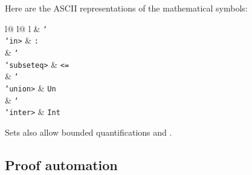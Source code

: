 \begin{isabellebody}
\begin{isamarkuptext}
Here are the ASCII representations of the mathematical symbols:
\begin{center}
\begin{tabular}{l@ {\quad}l@ {\quad}l}
 & \texttt{\char`\\\char`\<in>} & \texttt{:}\\
 & \texttt{\char`\\\char`\<subseteq>} & \texttt{<=}\\
 & \texttt{\char`\\\char`\<union>} & \texttt{Un}\\
 & \texttt{\char`\\\char`\<inter>} & \texttt{Int}
\end{tabular}
\end{center}
Sets also allow bounded quantifications  and
.

\subsection{Proof automation}


\end{isamarkuptext}
\end{isabellebody}

